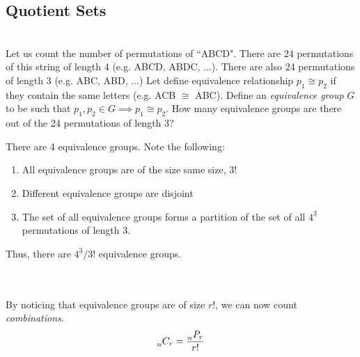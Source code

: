 \documentclass[11pt,twosided]{article}
\begin{document}
\subsection{Quotient Sets}
\begin{problem}\\
Let us count the number of permutations of ``ABCD". There are 24 permutations of this string of length 4 (e.g. ABCD, ABDC, ...). There are also 24 permutations of length 3 (e.g. ABC, ABD, ...) Let define equivalence relationship $p_1 \cong p_2$ if they contain the same letters (e.g. ACB $\cong$ ABC). Define an \emph{equivalence group} $G$ to be such that $p_1, p_2 \in G \implies p_1 \cong p_2$.
How many equivalence groups are there out of the 24 permutations of length 3?
\end{problem}
\begin{solution}
There are 4 equivalence groups. Note the following:
\begin{enumerate}
    \item All equivalence groups are of the size same size, 3!
    \item Different equivalence groups are disjoint
    \item The set of all equivalence groups forms a partition of the set of all $4^{\underline{3}}$ permutations of length 3.
\end{enumerate}
Thus, there are $4^{\underline{3}}/3!$ equivalence groups.
\end{solution} \\ \\
By noticing that equivalence groups are of size $r!$, we can now count \emph{combinations}.
\[
\prescript{}{n}{C_r} = \frac{\prescript{}{n}{P_r}}{r!}
\]
\end{document}

